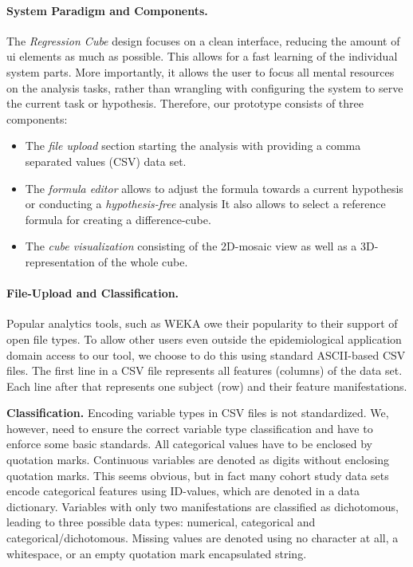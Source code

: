 \documentclass[journal]{style/vgtc} 			          %
\newcommand{\com}[1]{\textcolor{orange}{\uline{#1}}}
\begin{document}
\paragraph{System Paradigm and Components.}
The \emph{Regression Cube} design focuses on a clean interface, reducing the amount of ui elements as much as possible.
This allows for a fast learning of the individual system parts.
More importantly, it allows the user to focus all mental resources on the analysis tasks, rather than wrangling with configuring the system to serve the current task or hypothesis.
Therefore, our prototype consists of three components:
\begin{itemize}
	\item The \emph{file upload} section starting the analysis with providing a comma separated values (CSV) data set.
	\item The \emph{formula editor} allows to adjust the formula towards a current hypothesis or conducting a \emph{hypothesis-free} analysis
	It also allows to select a reference formula for creating a difference-cube.
	\item The \emph{cube visualization} consisting of the 2D-mosaic view as well as a 3D-representation of the whole cube.
\end{itemize}
\paragraph{File-Upload and Classification.}
Popular analytics tools, such as WEKA \cite{WEKA} owe their popularity to their support of open file types.
To allow other users even outside the epidemiological application domain access to our tool, we choose to do this using standard ASCII-based CSV files.
The first line in a CSV file represents all features (columns) of the data set.
Each line after that represents one subject (row) and their feature manifestations.

\textbf{Classification.}
Encoding variable types in CSV files is not standardized.
We, however, need to ensure the correct variable type classification and have to enforce some basic standards.
All categorical values have to be enclosed by quotation marks.
Continuous variables are denoted as digits without enclosing quotation marks.
This seems obvious, but in fact many cohort study data sets encode categorical features using ID-values, which are denoted in a data dictionary.
Variables with only two manifestations are classified as dichotomous, leading to three possible data types: numerical, categorical and categorical/dichotomous.
Missing values are denoted using no character at all, a whitespace, or an empty quotation mark encapsulated string.
\end{document}
